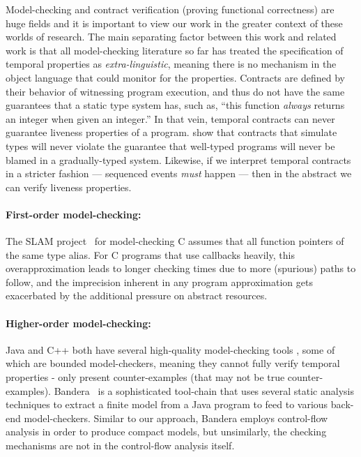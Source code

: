 Model-checking and contract verification (proving functional correctness) are huge fields and it is important to view our work in the greater context of these worlds of research.
%
The main separating factor between this work and related work is that all model-checking literature so far has treated the specification of temporal properties as \emph{extra-linguistic}, meaning there is no mechanism in the object language that could monitor for the properties.
%
Contracts are defined by their behavior of witnessing program execution, and thus do not have the same guarantees that a static type system has, such as, ``this function \emph{always} returns an integer when given an integer.''
%
In that vein, temporal contracts can never guarantee liveness properties of a program.
%
\citet{ianjohnson:dthf:complete} show that contracts that simulate types will never violate the guarantee that well-typed programs will never be blamed in a gradually-typed system.
%
Likewise, if we interpret temporal contracts in a stricter fashion --- sequenced events \emph{must} happen --- then in the abstract we can verify liveness properties.

\paragraph{First-order model-checking:}
The SLAM project~\citep{ianjohnson:Ball:2002:SLP:503272.503274} for model-checking C assumes that all function pointers of the same type alias.
%
For C programs that use callbacks heavily, this overapproximation leads to longer checking times due to more (spurious) paths to follow, and the imprecision inherent in any program approximation gets exacerbated by the additional pressure on abstract resources.

\paragraph{Higher-order model-checking:}
Java and C++ both have several high-quality model-checking tools \citep{ianjohnson:bandera, ianjohnson:java-pathfinder, ianjohnson:LLBMC}, some of which are bounded model-checkers, meaning they cannot fully verify temporal properties - only present counter-examples (that may not be true counter-examples).
%
Bandera~\citep{ianjohnson:bandera} is a sophisticated tool-chain that uses several static analysis techniques to extract a finite model from a Java program to feed to various back-end model-checkers.
%
Similar to our approach, Bandera employs control-flow analysis in order to produce compact models, but unsimilarly, the checking mechanisms are not in the control-flow analysis itself.

